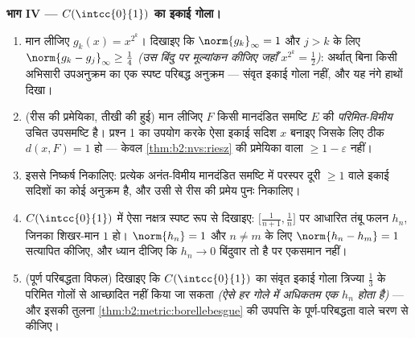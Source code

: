 \begin{problem}
\medskip
\noindent\textbf{भाग IV --- $C(\intcc{0}{1})$ का इकाई गोला।}
\begin{enumerate}[resume]
  \item मान लीजिए $g_k(x) = x^{2^k}$। दिखाइए कि $\norm{g_k}_\infty = 1$ और $j > k$ के लिए $\norm{g_k - g_j}_\infty \geq \frac14$ \emph{(उस बिंदु
        पर मूल्यांकन कीजिए जहाँ $x^{2^k} =
        \frac12$)}: अर्थात् बिना किसी अभिसारी
        उपअनुक्रम का एक स्पष्ट परिबद्ध अनुक्रम --- संवृत इकाई गोला
         नहीं, और यह नंगे हाथों दिखा।
  \item (रीस की प्रमेयिका, तीखी की हुई) मान लीजिए $F$ किसी मानदंडित
        समष्टि $E$ की \emph{परिमित-विमीय} उचित उपसमष्टि है। प्रश्न 1 का
        उपयोग करके ऐसा इकाई सदिश $x$ बनाइए जिसके लिए ठीक $d(x, F) = 1$ हो ---
        केवल \cref{thm:b2:nvs:riesz} की प्रमेयिका वाला $\geq 1 -
        \varepsilon$ नहीं।
  \item इससे निष्कर्ष निकालिए: प्रत्येक अनंत-विमीय मानदंडित समष्टि में
        परस्पर दूरी $\geq 1$ वाले इकाई सदिशों का कोई अनुक्रम है, और उसी से
        रीस की प्रमेय पुनः निकालिए।
  \item $C(\intcc{0}{1})$ में ऐसा नक्षत्र स्पष्ट रूप से दिखाइए: $\bigl[\frac1{n+1}, \frac1n\bigr]$ पर आधारित तंबू
        फलन $h_n$, जिनका शिखर-मान $1$ हो। $\norm{h_n} = 1$ और $n
        \neq m$ के लिए $\norm{h_n - h_m} = 1$
        सत्यापित कीजिए, और ध्यान दीजिए कि $h_n \to 0$ बिंदुवार तो है पर
        एकसमान नहीं।
  \item (पूर्ण परिबद्धता विफल) दिखाइए कि $C(\intcc{0}{1})$ का संवृत इकाई गोला
        त्रिज्या $\frac13$ के परिमित गोलों से आच्छादित नहीं किया जा सकता
        \emph{(ऐसे हर गोले में अधिकतम एक $h_n$ होता है)} --- और इसकी
        तुलना \cref{thm:b2:metric:borellebesgue} की उपपत्ति के पूर्ण-परिबद्धता वाले चरण से कीजिए।
\end{enumerate}


\end{problem}
